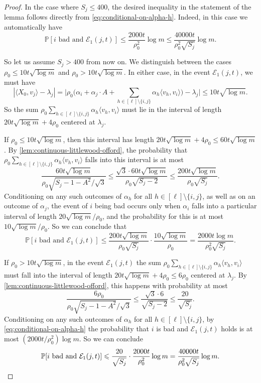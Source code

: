 \documentclass[reqno]{amsart}
\theoremstyle{remark}
\theoremstyle{definition}
\numberwithin{theorem}{section}
\renewcommand{\(}{\bigl(}
\renewcommand{\)}{\bigr)\vphantom{)}}
\newcommand{\cE}{\mathcal E}
\renewcommand{\le}{\leqslant}
\renewcommand{\P}{\mathbb{P}}
\newcommand{\ang}[1]{\langle#1\rangle}
\begin{document}
\begin{proof}
In the case where $S_j\le 400$, the desired inequality in the statement of the lemma follows directly from \eqref{eq:conditional-on-alpha-h}. Indeed, in this case we automatically have
\[\P[i\text{ bad}\text{ and }\cE_1(j,t)]\le  \frac{2000t}{\rho_0^2}\log m\le \frac{40000t}{\rho_0^2\sqrt{S_j}}\log m.\]

So let us assume $S_j > 400$ from  now on. We distinguish between the cases $\rho_0\le 10t\sqrt{\log m}$ and $\rho_0 > 10t\sqrt{\log m}$. In either case, in the event $\cE_1(j,t)$, we must have 
\[|\ang{X_0, v_j} - \lambda_j| = \Big|\rho_0\Big(\alpha_i+\alpha_j\cdot A + \sum_{h\in [\ell]\setminus\{i,j\}}\alpha_h\ang{v_h,v_i} \Big)- \lambda_j\Big| \le 10t\sqrt{\log m}.\]
So the sum $\rho_0\sum_{h\in [\ell]\setminus\{i,j\}}\alpha_h\ang{v_h,v_i}$ must lie in the interval of length $20t\sqrt{\log m}+4\rho_0$ centered at $\lambda_j$.

If $\rho_0\le 10t\sqrt{\log m}$, then this interval has length $20t\sqrt{\log m}+4\rho_0 \le 60t\sqrt{\log m}$. By \cref{lem:continuous-littlewood-offord}, the probability that $\rho_0\sum_{h\in [\ell]\setminus\{i,j\}}\alpha_h\ang{v_h,v_i}$ falls into this interval is at most 
\[\frac{60t\sqrt{\log m}}{\rho_0\sqrt{S_j - 1 - A^2}/\sqrt{3}}\le \frac{\sqrt{3}\cdot 60t\sqrt{\log m}}{\rho_0\sqrt{S_j - 2}}\le \frac{200t\sqrt{\log m}}{\rho_0\sqrt{S_j}}.\]
Conditioning on any such outcomes of $\alpha_h$ for all $h\in [\ell]\setminus\{i,j\}$, as well as on an outcome of $\alpha_j$, the event of $i$ being bad occurs only when $\alpha_i$ falls into a particular interval of length $20\sqrt{\log m}/\rho_0$, and the probability for this is at most $10\sqrt{\log m}/\rho_0$. So we can conclude that 
\[\P[i \text{ bad and }\cE_1(j,t)]\le \frac{200t\sqrt{\log m}}{\rho_0\sqrt{S_j}}\cdot \frac{10\sqrt{\log m}}{\rho_0} = \frac{2000t\log m}{\rho_0^2\sqrt{S_j}}.\]

If $\rho_0 > 10t\sqrt{\log m}$, in the event $\cE_1(j,t)$ the sum $\rho_0\sum_{h\in [\ell]\setminus\{i,j\}}\alpha_h\ang{v_h,v_i}$ must fall into the interval of length $20t\sqrt{\log m}+4\rho_0\le 6\rho_0$ centered at $\lambda_j$. By \cref{lem:continuous-littlewood-offord}, this happens with probability at most
\[\frac{6\rho_0}{\rho_0\sqrt{S_j - 1 - A^2}/\sqrt{3}}\le \frac{\sqrt{3}\cdot 6}{\sqrt{S_j - 2}}\le \frac{20}{\sqrt{S_j}}.\]
Conditioning on any such outcomes of $\alpha_h$ for all $h\in [\ell]\setminus\{i,j\}$, by \eqref{eq:conditional-on-alpha-h} the probability that $i$ is bad and $\cE_1(j,t)$ holds is at most  $(2000t/\rho_0^2)\log m$. So we can conclude 
\[\P[i\text{ bad}\text{ and }\cE_1(j,t)]\le  \frac{20}{\sqrt{S_j}}\cdot\frac{2000t}{\rho_0^2}\log m=\frac{40000t}{\rho_0^2\sqrt{S_j}}\log m. \qedhere\]
\end{proof}
\end{document}
